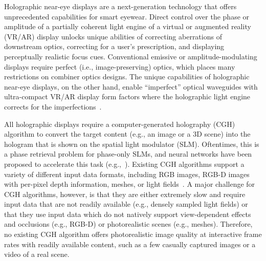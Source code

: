 
Holographic near-eye displays are a next-generation technology that offers unprecedented capabilities for smart eyewear. Direct control over the phase or amplitude of a partially coherent light engine of a virtual or augmented reality (VR/AR) display unlocks unique abilities of correcting aberrations of downstream optics, correcting for a user’s prescription, and displaying perceptually realistic focus cues. Conventional emissive or amplitude-modulating displays require perfect (i.e., image-preserving) optics, which places many restrictions on combiner optics designs. The unique capabilities of holographic near-eye displays, on the other hand, enable “imperfect” optical waveguides with ultra-compact VR/AR display form factors where the holographic light engine corrects for the imperfections~\cite{maimone2017holographic,kim:HolographicGlasses,jang2024waveguide,gopakumar2024full}. 

All holographic displays require a computer-generated holography (CGH) algorithm to convert the target content (e.g., an image or a 3D scene) into the hologram that is shown on the spatial light modulator (SLM). Oftentimes, this is a phase retrieval problem for phase-only SLMs, and neural networks have been proposed to accelerate this task (e.g.,~\cite{peng2020neural,shi2021towards,shi2022end}). Existing CGH algorithms support a variety of different input data formats, including RGB images, RGB-D images with per-pixel depth information, meshes, or light fields~\cite{park2017recent, gerchberg1972practical, wakunami2013occlusion, zhang2017computer, matsushima2009extremely, choi2022time, schiffers2023stochastic, chao2024large}. A major challenge for CGH algorithms, however, is that they are either extremely slow and require input data that are not readily available (e.g., densely sampled light fields) or that they use input data which do not natively support view-dependent effects and occlusions (e.g., RGB-D) or photorealistic scenes (e.g., meshes). Therefore, no existing CGH algorithm offers photorealistic image quality at interactive frame rates with readily available content, such as a few casually captured images or a video of a real scene.


